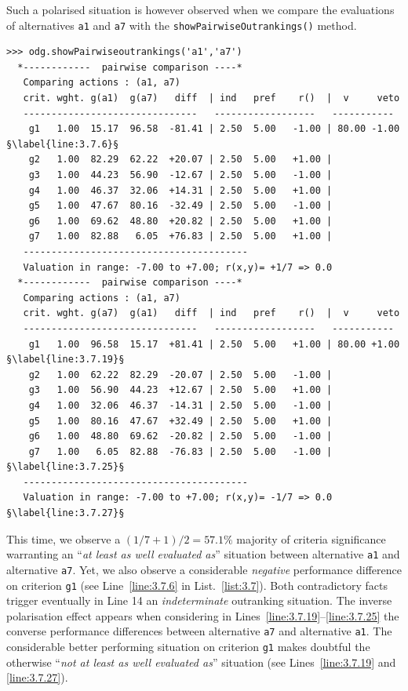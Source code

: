 Such a polarised situation is however observed when we compare the evaluations of alternatives \texttt{a1} and \texttt{a7} with the \texttt{showPairwiseOutrankings()} method. 
\begin{lstlisting}[caption={Pairwise comparison with considerable performance difference},label=list:3.7,basicstyle=\ttfamily\scriptsize]
>>> odg.showPairwiseoutrankings('a1','a7')
  *------------  pairwise comparison ----*
   Comparing actions : (a1, a7)
   crit. wght. g(a1)  g(a7)   diff  | ind   pref    r()  |  v     veto
   -------------------------------   ------------------   -----------
    g1   1.00  15.17  96.58  -81.41 | 2.50  5.00   -1.00 | 80.00 -1.00 §\label{line:3.7.6}§
    g2   1.00  82.29  62.22  +20.07 | 2.50  5.00   +1.00 | 
    g3   1.00  44.23  56.90  -12.67 | 2.50  5.00   -1.00 | 
    g4   1.00  46.37  32.06  +14.31 | 2.50  5.00   +1.00 | 
    g5   1.00  47.67  80.16  -32.49 | 2.50  5.00   -1.00 | 
    g6   1.00  69.62  48.80  +20.82 | 2.50  5.00   +1.00 | 
    g7   1.00  82.88   6.05  +76.83 | 2.50  5.00   +1.00 | 
   ----------------------------------------
   Valuation in range: -7.00 to +7.00; r(x,y)= +1/7 => 0.0
  *------------  pairwise comparison ----*
   Comparing actions : (a1, a7)
   crit. wght. g(a7)  g(a1)   diff  | ind   pref    r()  |  v     veto
   -------------------------------   ------------------   -----------
    g1   1.00  96.58  15.17  +81.41 | 2.50  5.00   +1.00 | 80.00 +1.00 §\label{line:3.7.19}§
    g2   1.00  62.22  82.29  -20.07 | 2.50  5.00   -1.00 | 
    g3   1.00  56.90  44.23  +12.67 | 2.50  5.00   +1.00 | 
    g4   1.00  32.06  46.37  -14.31 | 2.50  5.00   -1.00 | 
    g5   1.00  80.16  47.67  +32.49 | 2.50  5.00   +1.00 | 
    g6   1.00  48.80  69.62  -20.82 | 2.50  5.00   -1.00 | 
    g7   1.00   6.05  82.88  -76.83 | 2.50  5.00   -1.00 | §\label{line:3.7.25}§
   ----------------------------------------
   Valuation in range: -7.00 to +7.00; r(x,y)= -1/7 => 0.0 §\label{line:3.7.27}§
\end{lstlisting}

This time, we observe a $(1/7 + 1)/2 = 57.1\%$ majority of criteria significance warranting an ``\emph{at least as well evaluated as}'' situation between alternative \texttt{a1} and alternative \texttt{a7}. Yet, we also observe a considerable \emph{negative} performance difference on criterion \texttt{g1} (see Line~\ref{line:3.7.6} in List.~\vref{list:3.7}). Both contradictory facts trigger eventually in Line 14 an \emph{indeterminate} outranking situation. The inverse polarisation effect appears when considering in Lines~\ref{line:3.7.19}--\ref{line:3.7.25} the converse performance differences between alternative \texttt{a7} and alternative \texttt{a1}. The considerable better performing situation on criterion \texttt{g1} makes doubtful the otherwise ``\emph{not at least as well evaluated as}'' situation (see Lines~\ref{line:3.7.19} and \ref{line:3.7.27}).

